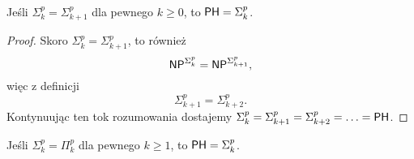 \begin{theorem}
    Jeśli $\Sigma_k^p = \Sigma_{k+1}^p$ dla pewnego $k \geq 0$, to $\textsf{PH} = \Sigma_k^p$.
\end{theorem}
\begin{proof}
    Skoro $\Sigma_k^p = \Sigma_{k+1}^p$, to również
    \[ \textsf{NP}^{\Sigma_k^p} = \textsf{NP}^{\Sigma_{k+1}^p}, \]
    więc z definicji
    \[ \Sigma_{k+1}^p = \Sigma_{k+2}^p. \]
    Kontynuując ten tok rozumowania dostajemy $\Sigma_k^p = \Sigma_{k+1}^p = \Sigma_{k+2}^p = \ldots = \textsf{PH}$.
\end{proof}

\begin{theorem}
    Jeśli $\Sigma_k^p = \Pi_k^p$ dla pewnego $k \geq 1$, to $\textsf{PH} = \Sigma_k^p$.
\end{theorem}